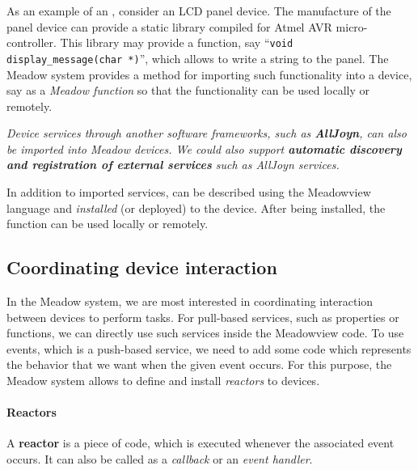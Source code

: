 \documentclass{note}
\begin{document}
As an example of an \textcolor{blue2}{}, consider an LCD
panel device. The manufacture of the panel device can provide a static library 
compiled for Atmel AVR micro-controller.
This library may provide a function, say
``\textcolor{red2}{\texttt{void display\_message(char *)}}'', which allows to 
write a string to the panel. The Meadow system provides a method for importing
such functionality into a device, say as a {\em Meadow function\/} so that 
the functionality can be used locally or remotely.

\textcolor{blue2}{\em Device services through another software frameworks,
  such as {\bf\em AllJoyn}, can also be imported into Meadow devices.
We could also support {\bf\em automatic discovery and registration of
external services\/} such as AllJoyn services.}


In addition to imported services, \textcolor{blue2}{} can be described using the {Meadowview  language} and {\em
  installed\/} (or deployed) to the device. After being installed, the
function can be used locally or remotely.


\subsection{Coordinating device interaction}
In the Meadow system, we are most interested in coordinating interaction
between devices to perform tasks.
For pull-based services, such as properties or functions, we can 
directly use such services inside the Meadowview code. To use events, which 
is a push-based service, we need to add some code which represents the
behavior that we want when the given event occurs.
For this purpose, the Meadow system allows to define and install {\em
  reactors\/} to devices.

\paragraph{Reactors}
A \textcolor{blue2}{\bf{}reactor} is a piece of code,
which is executed whenever the associated event occurs. 
It can also be called as a \textcolor{blue2}{\em callback\/} or an
\textcolor{blue2}{\em event handler\/}.  
\end{document}
